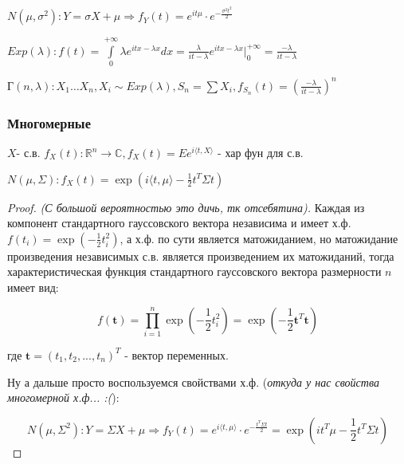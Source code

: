 \documentclass{article}
\begin{document}
    \begin{example}
        $N(\mu, \sigma^2): Y = \sigma X + \mu \Rightarrow f_Y(t) = e^{it\mu} \cdot e^{-\frac{\sigma^2t^2}{2}}$
    \end{example}
    \begin{example}
        $Exp(\lambda): f(t) = \int\limits_0^{+\infty} \lambda e^{itx - \lambda x} dx = \frac{\lambda}{it - \lambda} e^{itx - \lambda x}\bigg|_0^{+\infty} = \frac{-\lambda}{it - \lambda}$
    \end{example}
    \begin{example}
        $Г(n, \lambda): X_1 \dots X_n, X_i \sim Exp(\lambda), S_n = \sum X_i, f_{S_n}(t) = (\frac{-\lambda}{it - \lambda})^n $
    \end{example}
    \subsubsection{Многомерные}
    \begin{definition}
        $X $- с.в. $f_X(t): \mathbb{R}^n \to \mathbb C, f_X(t) = Ee^{i\langle t, X\rangle}$ - хар фун для с.в.
    \end{definition}
    \begin{example}
        $N(\mu, \Sigma): f_X(t) =\exp(i\langle t, \mu\rangle - \frac{1}{2} t^T \Sigma t)$
        \begin{proof}
            \textit{(С большой вероятностью это дичь, тк отсебятина).} Каждая из компонент стандартного гауссовского вектора независима и имеет х.ф.  $f(t_i) = \exp\left(-\frac{1}{2}t_i^2\right)$, а х.ф. по сути является матожиданием, но матожидание произведения независимых с.в. является произведением их матожиданий, тогда характеристическая функция стандартного гауссовского вектора размерности $n$ имеет вид:

            $$f(\boldsymbol{t}) = \prod_{i=1}^n \exp\left(-\frac{1}{2}t_i^2\right) = \exp\left(-\frac{1}{2}\boldsymbol{t}^T\boldsymbol{t}\right)$$
            
            где $\boldsymbol{t} = (t_1, t_2, ..., t_n)^T$ - вектор переменных.

            Ну а дальше просто воспользуемся свойствами х.ф. (\textit{откуда у нас свойства многомерной х.ф... :(}):

            $$ N(\mu, \Sigma^2): Y = \Sigma X + \mu \Rightarrow f_Y(t) = e^{i\langle t, \mu \rangle} \cdot e^{-\frac{t^T\Sigma t}{2}} = \exp(i t^T \mu - \frac{1}{2} t^T \Sigma t) $$
            
        \end{proof}
    \end{example}
\end{document}
